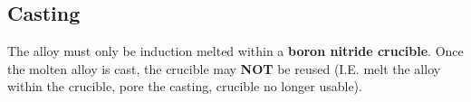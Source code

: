 \subsection{Casting}

The \MgZnCa alloy must only be induction melted within a \textbf{boron nitride crucible}. Once the molten alloy is cast, the crucible may \textbf{NOT} be reused (I.E. melt the alloy within the crucible, pore the casting, crucible no longer usable). 